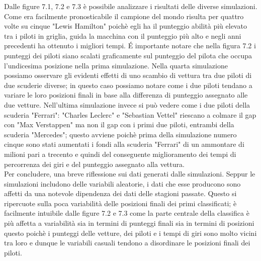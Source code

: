 Dalle figure 7.1, 7.2 e 7.3 è possibile analizzare i risultati delle diverse simulazioni. Come era facilmente pronosticabile il campione del mondo risulta per quattro volte su cinque "Lewis Hamilton" poichè egli ha il punteggio abilità più elevato tra i piloti in griglia, guida la macchina con il punteggio più alto e negli anni precedenti ha ottenuto i migliori tempi. É importante notare che nella figura 7.2 i punteggi dei piloti siano scalati graficamente sul punteggio del pilota che occupa l'undicesima posizione nella prima simulazione. Nella quarta simulazione possiamo osservare gli evidenti effetti di uno scambio di vettura tra due piloti di due scuderie diverse; in questo caso possiamo notare come i due piloti tendano a variare le loro posizioni finali in base alla differenza di punteggio assegnato alle due vetture. Nell'ultima simulazione invece si può vedere come i due piloti della scuderia "Ferrari": "Charles Leclerc" e "Sebastian Vettel" riescano a colmare il gap con "Max Verstappen" ma non il gap con i primi due piloti, entrambi della scuderia "Mercedes"; questo avviene poichè prima della simulazione numero cinque sono stati aumentati i fondi alla scuderia "Ferrari" di un ammontare di milioni pari a trecento e quindi del conseguente miglioramento dei tempi di percorrenza dei giri e del punteggio assegnato alla vettura.\\
Per concludere, una breve riflessione sui dati generati dalle simulazioni. Seppur le simulazioni includono delle variabili aleatorie, i dati che esse producono sono affetti da una notevole dipendenza dei dati delle stagioni passate. Questo si ripercuote sulla poca variabilità delle posizioni finali dei primi classificati; è facilmente intuibile dalle figure 7.2 e 7.3 come la parte centrale della classifica è più affetta a variabilità sia in termini di punteggi finali sia in termini di posizioni questo poichè i punteggi delle vetture, dei piloti e i tempi di giri sono molto vicini tra loro e dunque le variabili casuali tendono a disordinare le posizioni finali dei piloti.
\clearpage

